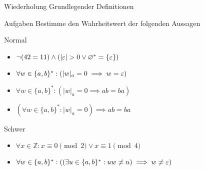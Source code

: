{
\begin{frame}[fragile]{Wiederholung Grundlegender Definitionen}
    \begin{alertblock}{Aufgaben}
        Bestimme den Wahrheitswert der folgenden Aussagen
    \end{alertblock}
    \begin{block}{Normal}
        \begin{itemize}
            \item $\neg (42 = 11) \wedge (|\varepsilon| > 0 \vee \varnothing^* = \{\varepsilon\})$
            \item $\forall w \in \{a, b\}^*: (|w|_a = 0 \implies w = \varepsilon)$
            \item $\forall w \in \{a, b\}^*: (|w|_a = 0 \implies ab = ba)$
            \item $(\forall w \in \{a, b\}^*: |w|_a = 0) \implies ab = ba$
        \end{itemize}
    \end{block}
    \begin{block}{Schwer}
        \begin{itemize}
            \item $\forall x \in \mathbb{Z}: x \equiv 0 \pmod{2} \vee x \equiv 1 \pmod{4}$
            \item $\forall w \in \{a, b\}^*: \left(\left(\exists u \in \{a,b\}^*: uw \neq u\right) \implies w \neq \varepsilon\right)$
        \end{itemize}
    \end{block}
\end{frame}
}

